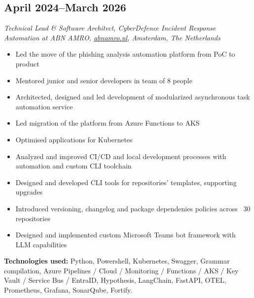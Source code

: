 \subsection*{April 2024--March 2026}

\textit{Technical Lead \& Software Architect, CyberDefence Incident Response Automation at ABN AMRO, \href{https://abnamro.nl}{\url{abnamro.nl}}, Amsterdam, The Netherlands}

\begin{itemize}[noitemsep]
  \item Led the move of the phishing analysis automation platform from PoC to product
  \item Mentored junior and senior developers in team of 8 people
  \item Architected, designed and led development of modularized asynchronous task automation service
  \item Led migration of the platform from Azure Functions to AKS
  \item Optimised applications for Kubernetes
  \item Analyzed and improved CI/CD and local development processes with automation and custom CLI toolchain
  \item Designed and developed CLI tools for repositories' templates, supporting upgrades
  \item Introduced versioning, changelog and package dependenies policies across ~30 repositories
  \item Designed and implemented custom Microsoft Teams bot framework with LLM capabilities
\end{itemize}

\textbf{Technologies used:}
Python, Powershell, Kubernetes, Swagger, Grammar compilation,
Azure Pipelines / Cloud / Monitoring / Functions / AKS / Key Vault / Service Bus / EntraID,
Hypothesis, LangChain, FastAPI, OTEL, Prometheus, Grafana,
SonarQube, Fortify.
